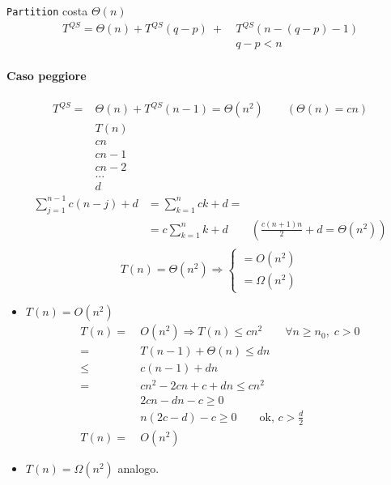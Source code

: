 \texttt{Partition} costa $\Theta (n)$
\begin{align*}
	T^{QS} = \Theta (n) + T^{QS}(q - p) \ + \ &T^{QS}(n - (q - p) - 1) \\
	& q - p < n
\end{align*}

\paragraph{Caso peggiore}
\begin{align*}
	T^{QS} = & \Theta (n) + T^{QS}(n - 1) = \Theta (n^2) \qquad (\Theta (n) = cn)\\
	& T(n) \\
	& cn \\
	& cn-1 \\
	& cn-2 \\
	&\dots \\
	& d
\end{align*}
\begin{align*}
	\displaystyle\sum^{n-1}_{j=1} c(n-j) + d & = \displaystyle\sum^{n}_{k=1} ck + d = \\
	& = c\displaystyle\sum^{n}_{k=1}k + d \qquad \left(\frac{c(n+1)n}{2} + d = \Theta (n^2) \right)\\
\end{align*}
\[ T(n) = \Theta(n^2) \Rightarrow
	\begin{cases}
	= O(n^2) \\
	= \Omega(n^2)
	\end{cases}
\]

\begin{itemize}[label=$\bullet$]
	\item $T(n) = O(n^2)$
	\begin{align*}
		T(n) = \ & O(n^2) \Rightarrow T(n) \leq cn^2 \qquad \forall n \geq n_0, \; c > 0 \\
		= \ & T(n - 1) + \Theta(n) \leq dn \\
		\leq \ & c(n - 1) + dn \\
		= \ & cn^2 - 2cn + c + dn \leq cn^2 \\
		& 2cn - dn - c \geq 0 \\
		& n (2c - d) - c \geq 0 \qquad \text{ok, } c > \frac{d}{2} \\
		T(n) = \ & O(n^2)
	\end{align*}

	\item $T(n) = \Omega(n^2)$ analogo.
\end{itemize}

